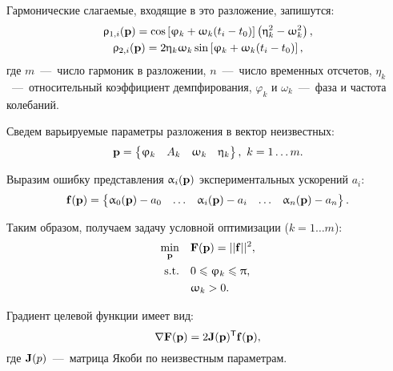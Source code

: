 Гармонические слагаемые, входящие в это разложение, запишутся:
\begin{equation}
	\begin{gathered}
		\uprho_{1, i}(\mathbf{p}) = \cos \left[ \upvarphi_k + \upomega_k (t_i - t_0) \right] \left( \upeta_k ^ 2 - \upomega_k ^ 2 \right), \\
		\uprho_{2, i}(\mathbf{p}) = 2 \upeta_k \upomega_k \sin \left[ \upvarphi_k + \upomega_k (t_i - t_0) \right],
	\end{gathered}
\end{equation}
где $ m $~---~число гармоник в разложении, $ n $~---~число временных отсчетов, $ \eta_k $~---~относительный коэффициент демпфирования, $ \varphi_k $ и $ \omega_k $~---~фаза и частота колебаний. 

Сведем варьируемые параметры разложения в вектор неизвестных:
\begin{equation}
	\mathbf{p} = 
	\begin{Bmatrix}
		\upvarphi_k & A_k & \upomega_k & \upeta_k
	\end{Bmatrix}, \ k = 1 \hdots m.
\end{equation}

Выразим ошибку представления $ \upalpha_i(\mathbf{p}) $ экспериментальных ускорений $ a_i $:
\begin{equation}
	\mathbf{f(\mathbf{p})} = 
	\begin{Bmatrix}
		\upalpha_0(\mathbf{p}) - a_0 & \hdots & \upalpha_i(\mathbf{p}) - a_i & \hdots & \upalpha_n(\mathbf{p}) - a_n
	\end{Bmatrix}.
\end{equation}

Таким образом, получаем задачу условной оптимизации ($ k = 1 \hdots m $):
\begin{equation}
	\begin{aligned}
		\min_{\mathbf{p}} \quad & \mathbf{F}(\mathbf{p}) = \vert \vert \mathbf{f} \vert \vert ^ 2, \\
		\textrm{s.t.} \quad & 0 \leqslant \upvarphi_k \leqslant \uppi, \\
		 				    & \upomega_k > 0. \\
	\end{aligned} \label{eq:problemADA}
\end{equation}

Градиент целевой функции имеет вид:
\begin{equation}
	\nabla \mathbf{F(\mathbf{p})} = 2 \mathbf{J}(\mathbf{p}) ^ \mathsf{T} \mathbf{f(\mathbf{p})},
\end{equation}
где $ \mathbf{J}(p) $~---~матрица Якоби по неизвестным параметрам.


